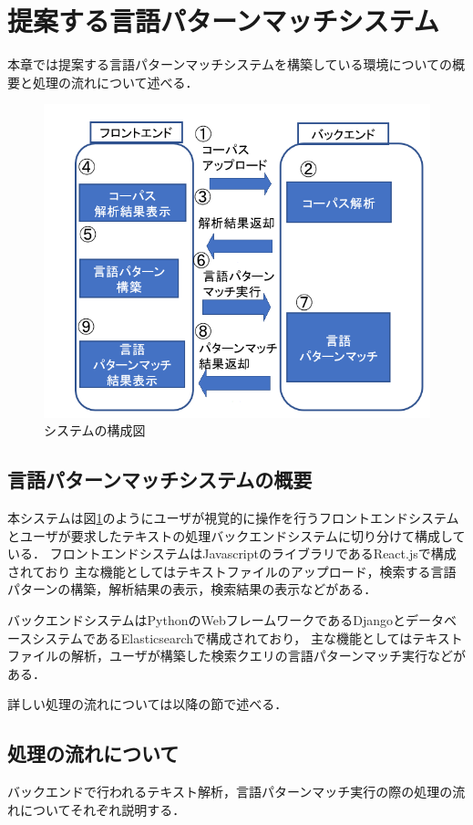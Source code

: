 \documentclass{FITpaper}
\begin{document}
\section{提案する言語パターンマッチシステム}
本章では提案する言語パターンマッチシステムを構築している環境についての概要と処理の流れについて述べる．
\begin{figure}[htbp]
  \centering
  \includegraphics[scale=0.4]{fig/system_fig.png}
  \caption{システムの構成図}
  \label{fig:sys}
\end{figure}
\subsection{言語パターンマッチシステムの概要}
本システムは図\ref{fig:sys}のようにユーザが視覚的に操作を行うフロントエンドシステムとユーザが要求したテキストの処理バックエンドシステムに切り分けて構成している．
フロントエンドシステムはJavascriptのライブラリであるReact.jsで構成されており
主な機能としてはテキストファイルのアップロード，検索する言語パターンの構築，解析結果の表示，検索結果の表示などがある．

バックエンドシステムはPythonのWebフレームワークであるDjangoとデータベースシステムであるElasticsearchで構成されており，
主な機能としてはテキストファイルの解析，ユーザが構築した検索クエリの言語パターンマッチ実行などがある．

詳しい処理の流れについては以降の節で述べる．

\subsection{処理の流れについて}
バックエンドで行われるテキスト解析，言語パターンマッチ実行の際の処理の流れについてそれぞれ説明する．
\end{document}
